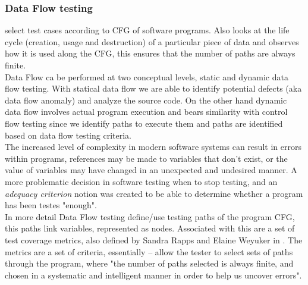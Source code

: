 \documentclass[10pt, conference, compsocconf]{IEEEtran}
\begin{document}
\subsubsection{Data Flow testing} select test cases according to CFG of software programs. Also looks at the life cycle (creation, usage and destruction)
of a particular piece of data and observes how it is used along the CFG, this ensures that the number of paths are always finite\cite{dataflow}.\\
Data Flow ca be performed at two conceptual levels, static and dynamic data flow testing. With statical data flow we are able to identify potential
defects (aka data flow anomaly) and analyze the source code. On the other hand dynamic data flow involves actual program execution and bears similarity with control flow testing
since we identify paths to execute them and paths are identified based on data flow testing criteria.\\
The increased level of complexity in modern software systems can result in errors within programs, references may be made to variables that don't exist,
or the value of variables may have changed in an unexpected and undesired manner. A more problematic decision in software testing when to stop testing,
and an \textit{adequacy criterion}\cite{Frankl:1988:AFD:53064.53075} notion was created to be able to determine whether a program has been testes "enough".\\
In more detail Data Flow testing define/use testing paths of the program CFG, this paths link variables, represented as nodes\cite{dataflow}.
Associated with this are a set of test coverage metrics, also defined by Sandra Rapps and Elaine Weyuker in \cite{dataflow}.
The metrics are a set of criteria, essentially – allow the tester to select sets of paths through the program, where "the number of paths selected
is always finite, and chosen in a systematic and intelligent manner in order to
help us uncover errors".
\end{document}
